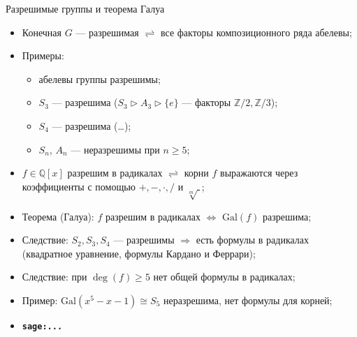 \documentclass[serif, aspectratio=169]{beamer}
\newcommand{\sagemark}{%
  \textcolor{green!40!black}{\textbf{\texttt{sage:...}}}%
}
\begin{document}
\begin{frame}{Разрешимые группы и теорема Галуа}
    \begin{itemize}
        \item Конечная $G$ --- разрешимая $\rightleftharpoons$ все факторы композиционного ряда абелевы;
        \item Примеры:
        \begin{itemize}
            \item абелевы группы разрешимы;
            \item $S_3$ --- разрешима ($S_3\rhd A_3\rhd\{e\}$ --- факторы $\mathbb{Z}/2,\mathbb{Z}/3$);
            \item $S_4$ --- разрешима (\dots);
            \item $S_n$, $A_n$ --- неразрешимы при $n\ge5$;
        \end{itemize}
        \item $f\in\mathbb{Q}[x]$ разрешим в радикалах $\rightleftharpoons$ корни $f$ выражаются через коэффициенты с помощью $+,-,\cdot,/$ и $\sqrt[m]{\ }$;
        \item Теорема (Галуа): $f$ разрешим в радикалах $\Leftrightarrow$ $\mathrm{Gal}(f)$ разрешима;
        \item Следствие: $S_2,S_3,S_4$ --- разрешимы $\Rightarrow$ есть формулы в радикалах (квадратное уравнение, формулы Кардано и Феррари);
        \item Следствие: при $\deg(f)\ge5$ нет общей формулы в радикалах;
        \item Пример: $\mathrm{Gal}(x^5-x-1)\cong S_5$ неразрешима, нет формулы для корней;
        \item \sagemark
    \end{itemize}
\end{frame}
\end{document}
